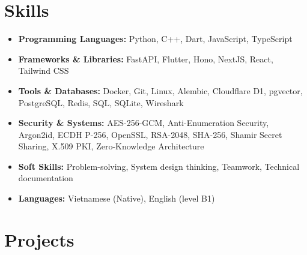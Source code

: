 \documentclass[10pt,a4paper]{article}
\begin{document}
\section*{Skills}
\begin{itemize}[leftmargin=0.15in, label={}, itemsep=0pt]
    \item \textbf{Programming Languages:} Python, C++, Dart, JavaScript, TypeScript
    \item \textbf{Frameworks \& Libraries:} FastAPI, Flutter, Hono, NextJS, React, Tailwind CSS
    \item \textbf{Tools \& Databases:} Docker, Git, Linux, Alembic, Cloudflare D1, pgvector, PostgreSQL, Redis, SQL, SQLite, Wireshark
    \item \textbf{Security \& Systems:} AES-256-GCM, Anti-Enumeration Security, Argon2id, ECDH P-256, OpenSSL, RSA-2048, SHA-256, Shamir Secret Sharing, X.509 PKI, Zero-Knowledge Architecture
    \item \textbf{Soft Skills:} Problem-solving, System design thinking, Teamwork, Technical documentation
    \item \textbf{Languages:} Vietnamese (Native), English (level B1)
\end{itemize}

\section*{Projects}
\end{document}
